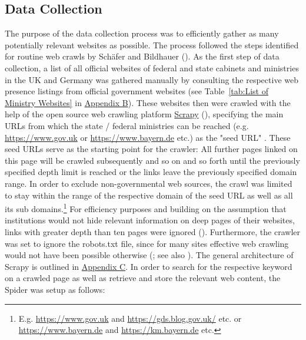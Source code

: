 \subsection{Data Collection}\label{Data Collection}
The purpose of the data collection process was to efficiently gather as many potentially relevant websites as possible. The process followed the steps identified for routine web crawls by Schäfer and Bildhauer (\cite*{Schafer2012}). As the first step of data collection, a list of all official websites of federal and state cabinets and ministries in the UK and Germany was gathered manually by consulting the respective web presence listings from official government websites (see Table~\ref{tab:List of Ministry Websites} in \hyperref[Appendix B]{Appendix B}). These websites then were crawled with the help of the open source web crawling platform \href{https://scrapy.org }{Scrapy} (\cite{Kouzis-Loukas2016}), specifying the main URLs from which the state / federal ministries can be reached (e.g. \url{https://www.gov.uk} or \url{https://www.bayern.de} etc.) as the "seed URL" \parencite[p. 115]{Barbaresi2015}. These seed URLs serve as the starting point for the crawler: All further pages linked on this page will be crawled subsequently and so on and so forth until the previously specified depth limit is reached or the links leave the previously specified domain range. In order to exclude non-governmental web sources, the crawl was limited to stay within the range of the respective domain of the seed URL as well as all its sub domains.\footnote{E.g. \url{https://www.gov.uk} and \url{https://gds.blog.gov.uk/} etc. or \url{https://www.bayern.de} and \url{https://km.bayern.de} etc.} For efficiency purposes and building on the assumption that institutions would not hide relevant information on deep pages of their websites, links with greater depth than ten pages were ignored (\cite{Scrapy2018, Wang2019}). Furthermore, the crawler was set to ignore the robots.txt file, since for many sites effective web crawling would not have been possible otherwise (\cite{Sun2007}; see also \cite[p. 125]{Barbaresi2015}). The general architecture of Scrapy is outlined in \hyperref[Appendix C]{Appendix C}. In order to search for the respective keyword on a crawled page as well as retrieve and store the relevant web content, the Spider was setup as follows:
%
